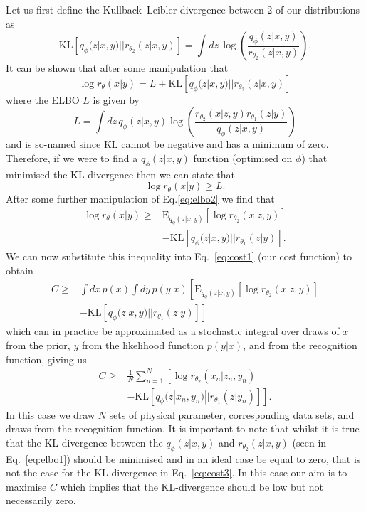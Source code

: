 \documentclass[%
showpacs,
 amsmath,amssymb,
 aps,
 twocolumn,
 prl,
 reprint,
floatfix,
]{revtex4-1}
\begin{document}
Let us first define the Kullback–Leibler divergence between 2 of our
distributions as
%
\begin{equation}\label{eq:kl}
\text{KL}\left[q_{\phi}(z|x,y)||r_{\theta_{2}}(z|x,y)\right] = \int dz\,
\log\left(\frac{q_{\phi}(z|x,y)}{r_{\theta_{2}}(z|x,y)}\right).
\end{equation}
%  
It can be shown that after some manipulation that
%
\begin{equation}\label{eq:elbo1}
\log r_{\theta}(x|y) = L + \text{KL}\left[q_{\phi}(z|x,y)||r_{\theta_{?}}(z|x,y)\right]
\end{equation}
%
where the \ac{ELBO} $L$ is given by
%
\begin{equation}\label{eq:elbo2}
L = \int dz\,
q_{\phi}(z|x,y)\log\left(\frac{r_{\theta_{2}}(x|z,y)r_{\theta_{1}}(z|y)}{q_{\phi}(z|x,y)}\right)
\end{equation}
%
and is so-named since $\text{KL}$ cannot be negative and has a minimum of zero.
Therefore, if we were to find a $q_{\phi}(z|x,y)$ function (optimised on
$\phi$) that minimised the KL-divergence then we can state that
%
\begin{equation}
\log r_{\theta}(x|y) \geq L.
\end{equation}
%
After some further manipulation of Eq.\ref{eq:elbo2} we find that
%
\begin{align}\label{eq:logr}
\log r_{\theta}(x|y) \geq & \text{E}_{q_{\phi}(z|x,y)}\left[\log
r_{\theta_{2}}(x|z,y)\right] \nonumber\\
&-\text{KL}\left[q_{\phi}(z|x,y)||r_{\theta_{1}}(z|y)\right].
\end{align}
%
We can now substitute this inequality into Eq.~\ref{eq:cost1} (our cost
function) to obtain
%
\begin{align}\label{eq:cost2}
C \geq & \int dx\, p(x)\int dy\,p(y|x)
\left[\text{E}_{q_{\phi}(z|x,y)}\left[\log r_{\theta_{2}}(x|z,y)\right]
\right.\nonumber\\
&-\left.\text{KL}\left[q_{\phi}(z|x,y)||r_{\theta_{1}}(z|y)\right]\right]  
\end{align}
%
which can in practice be approximated as a stochastic integral over draws of
$x$ from the prior, $y$ from the likelihood function $p(y|x)$, and from the
recognition function, giving us
%
\begin{align}\label{eq:cost3}
C \geq & \frac{1}{N}\sum_{n=1}^{N}\left[\log
r_{\theta_{2}}(x_{n}|z_{n},y_{n})\right.\nonumber\\
&\left.-\text{KL}\left[q_{\phi}(z|x_{n},y_{n})||r_{\theta_{1}}(z|y_{n})\right]\right].
\end{align}
% 
In this case we draw $N$ sets of physical parameter, corresponding data
sets, and draws from the recognition function. It is important to note that
whilst it is true that the KL-divergence between the $q_{\phi}(z|x,y)$ and
$r_{\theta_{2}}(z|x,y)$ (seen in Eq.~\ref{eq:elbo1}) should be minimised and in
an ideal case be equal to zero, that is not the case for the KL-divergence in
Eq.~\ref{eq:cost3}. In this case our aim is to maximise $C$ which implies that
the KL-divergence should be low but not necessarily zero.
\end{document}
